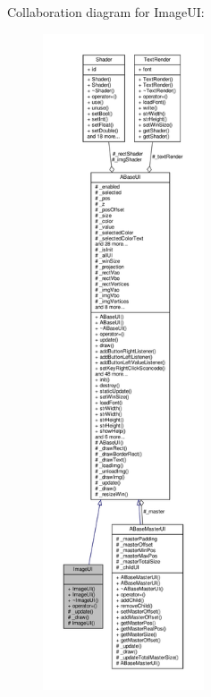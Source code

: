 Collaboration diagram for Image\+UI\+:
\nopagebreak
\begin{figure}[H]
\begin{center}
\leavevmode
\includegraphics[height=550pt]{class_image_u_i__coll__graph}
\end{center}
\end{figure}
